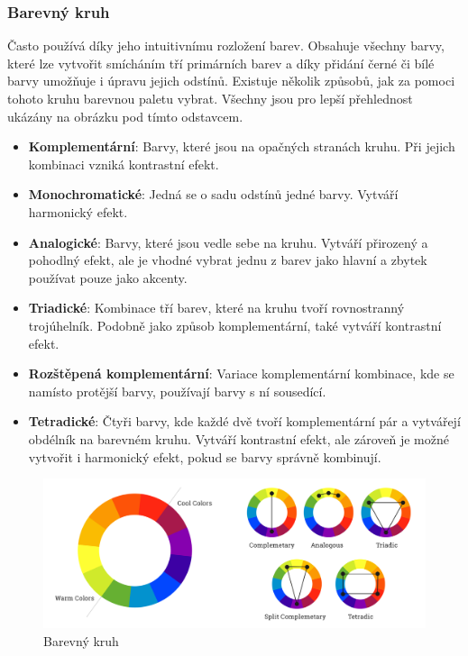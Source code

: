 \subsubsection*{Barevný kruh}
Často používá díky jeho intuitivnímu rozložení barev. Obsahuje všechny barvy, které lze vytvořit smícháním tří primárních barev a díky přidání černé či bílé barvy umožňuje i úpravu jejich odstínů. Existuje několik způsobů, jak za pomoci tohoto kruhu barevnou paletu vybrat. Všechny jsou pro lepší přehlednost ukázány na obrázku pod tímto odstavcem.

\begin{itemize}
    \item \textbf{Komplementární}: Barvy, které jsou na opačných stranách kruhu. Při jejich kombinaci vzniká kontrastní efekt.
    \item \textbf{Monochromatické}: Jedná se o sadu odstínů jedné barvy. Vytváří harmonický efekt.
    \item \textbf{Analogické}: Barvy, které jsou vedle sebe na kruhu. Vytváří přirozený a pohodlný efekt, ale je vhodné vybrat jednu z barev jako hlavní a zbytek používat pouze jako akcenty.
    \item \textbf{Triadické}: Kombinace tří barev, které na kruhu tvoří rovnostranný trojúhelník. Podobně jako způsob komplementární, také vytváří kontrastní efekt.
    \item \textbf{Rozštěpená komplementární}: Variace komplementární kombinace, kde se namísto protější barvy, používají barvy s ní sousedící. 
    \item \textbf{Tetradické}: Čtyři barvy, kde každé dvě tvoří komplementární pár a vytvářejí obdélník na barevném kruhu. Vytváří kontrastní efekt, ale zároveň je možné vytvořit i harmonický efekt, pokud se barvy správně kombinují.
\end{itemize}

\begin{figure}[H]
    \centering
    \includegraphics[width=\textwidth]{resources/figures/color_theory.png}
    \caption[Barevný kruh]{Barevný kruh\footnotemark}
    \label{fig:color-wheel}
\end{figure}

